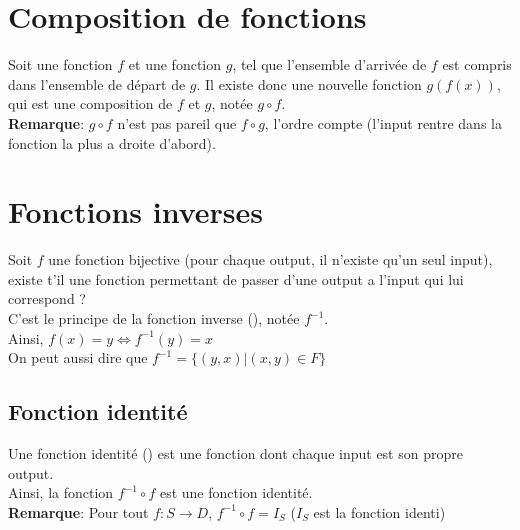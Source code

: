 \documentclass{article}
\begin{document}
\section{Composition de fonctions}
Soit une fonction $f$ et une fonction $g$, tel que l'ensemble d'arrivée de $f$ est compris dans l'ensemble de départ de $g$. Il existe donc une nouvelle fonction $g(f(x))$, qui est une composition de $f$ et $g$, notée $g \circ f$.\\
\textbf{Remarque}: $g \circ f$ n'est pas pareil que $f \circ g$, l'ordre compte (l'input rentre dans la fonction la plus a droite d'abord).

\section{Fonctions inverses}
Soit $f$ une fonction bijective (pour chaque output, il n'existe qu'un seul input), existe t'il une fonction permettant de passer d'une output a l'input qui lui correspond ? \\
C'est le principe de la fonction inverse (), notée $f^{-1}$.\\
Ainsi, $f(x) = y \Leftrightarrow f^{-1}(y) = x$\\
On peut aussi dire que $f^{-1} = \{(y,x) | (x,y) \in F\}$\\

\subsection{Fonction identité}
Une fonction identité () est une fonction dont chaque input est son propre output.\\
Ainsi, la fonction $f^{-1} \circ f$ est une fonction identité.\\ 
\textbf{Remarque}: Pour tout $f : S \to D$, $f^{-1} \circ f = I_{S}$ ($I_{S}$ est la fonction identi)
       
  
\end{document}
